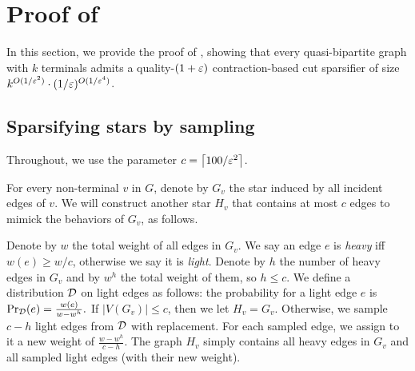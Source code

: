 \section{Proof of }
\label{sec: quasi_apx}

In this section, we provide the proof of , showing that every quasi-bipartite graph with $k$ terminals admits a quality-$(1+{\varepsilon})$ contraction-based cut sparsifier of size $k^{O(1/{\varepsilon}^2)}\cdot (1/{\varepsilon})^{O(1/{\varepsilon}^4)}$. 





\subsection{Sparsifying stars by sampling}
\label{subsec: sparsified star}

Throughout, we use the parameter $c = \left\lceil 100/{\varepsilon}^2 \right\rceil$. %

For every non-terminal $v$ in $G$, denote by $G_v$ the star induced by all incident edges of $v$. We will construct another star $H_v$ that contains at most $c$ edges to mimick the behaviors of $G_v$, as follows.

Denote by $w$ the total weight of all edges in $G_v$.
We say an edge $e$ is \emph{heavy} iff $w(e)\ge w/c$, otherwise we say it is \emph{light}.
Denote by $h$ the number of heavy edges in $G_v$ and by $w^h$ the total weight of them, so $h\le c$.
We define a distribution ${\mathcal{D}}$ on light edges as follows: the probability for a light edge $e$ is 
$\text{Pr}_{{\mathcal{D}}}(e)=\frac{w(e)}{w-w^h}.$
If $|V(G_v)|\le c$, then we let $H_v=G_v$.
Otherwise, we sample $c-h$ light edges from ${\mathcal{D}}$ with replacement. For each sampled edge, we assign to it a new weight of $\frac{w-w^h}{c-h}$.
The graph $H_v$ simply contains all heavy edges in $G_v$ and all sampled light edges (with their new weight).

